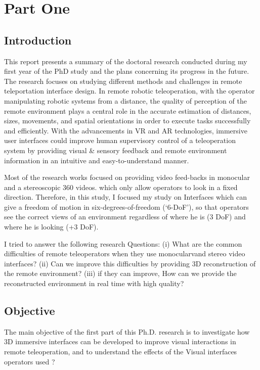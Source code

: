 \chapter{Part One}
\section{Introduction}
This report presents a summary of the doctoral research conducted during my first year
of the PhD study and the plans concerning its progress in the future. The research focuses on studying different methods and challenges in remote teleportation interface design. In remote robotic teleoperation, with the operator manipulating robotic systems from a distance, the quality of perception of the remote environment plays a central role in the accurate estimation of distances, sizes, movements, and spatial orientations in order to execute tasks successfully and efficiently. With the advancements in VR and AR technologies, immersive user interfaces could improve human supervisory control of a teleoperation system by providing visual & sensory feedback and remote environment information in an intuitive and easy-to-understand manner.

Most of the research works focused on providing video feed-backs in monocular and a stereoscopic 360 videos. which only allow operators to look in a fixed direction. Therefore, in this study, I focused my study on Interfaces which can give a freedom of motion in six-degrees-of-freedom (‘6-DoF’), so that operators see the correct views of an environment regardless of where he is (3 DoF) and where he is looking (+3 DoF).

I tried to answer the following research Questions: (i) What are the common difficulties of remote teleoperators when they use monocularvand stereo video interfaces? (ii) Can we improve this difficulties by providing 3D reconstruction of the remote environment? (iii) if they can improve, How can we provide the reconstructed environment in real time with high quality?

\section{Objective}

The main objective of the first part of this Ph.D. research is to investigate how 3D immersive interfaces can be developed to improve visual interactions in remote teleoperation, and to understand the effects of the Visual interfaces operators used ?

